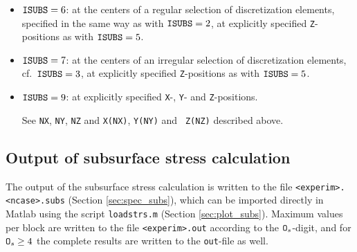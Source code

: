 \documentclass[12pt]{report}
\begin{document}
\begin{itemize}
\item ${\tt ISUBS}=6$: at the centers of a regular selection of
discretization elements, specified in the same way as with ${\tt ISUBS}=2$,
at explicitly specified {\tt Z}-positions as with ${\tt ISUBS}=5$.

\item ${\tt ISUBS}=7$: at the centers of an irregular selection of
discretization elements, cf.\ ${\tt ISUBS}=3$, at explicitly specified
{\tt Z}-positions as with ${\tt ISUBS}=5$.

\item ${\tt ISUBS}=9$: at explicitly specified {\tt X}-, {\tt Y}- and
{\tt Z}-positions.

See {\tt NX}, {\tt NY}, {\tt NZ} and {\tt X(NX)}, {\tt Y(NY)} and {\tt
Z(NZ)} described above.
\end{itemize}

\subsection{Output of subsurface stress calculation}
\label{sec:subsurf_out}

The output of the subsurface stress calculation is written to the file
{\tt <experim>.<ncase>.subs} (Section \ref{sec:spec_subs}), which can be
imported directly in Matlab using the script {\tt load\-strs\-.m}
(Section \ref{sec:plot_subs}). Maximum values per block are written to the
file {\tt <experim>.out} according to the ${\tt O}_s$-digit, and for
${\tt O}_s\ge 4$ the complete results are written to the {\tt out}-file
as well.
\end{document}
